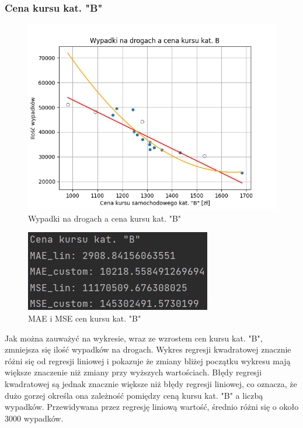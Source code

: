 \documentclass[10pt]{article}
\begin{document}
\subsubsection{Cena kursu kat. "B"}
\begin{figure}[h]
\begin{center}
\includegraphics[width=0.5\linewidth]{images/plots/kurs.png}
\caption{Wypadki na drogach a cena kursu kat. "B"}
\end{center}
\end{figure}
\begin{figure}[h]
\begin{center}
\includegraphics[width=0.5\linewidth]{images/errors/kurs_errors.png}
\caption{MAE i MSE cen kursu kat. "B"}
\end{center}
\end{figure}
Jak można zauważyć na wykresie, wraz ze wzrostem cen kursu kat. "B", zmniejsza się ilość wypadków na drogach. Wykres regresji kwadratowej znacznie różni się od regresji liniowej i pokazuje że zmiany bliżej początku wykresu mają większe znaczenie niż zmiany przy wyższych wartościach. Błędy regresji kwadratowej są jednak znacznie większe niż błędy regresji liniowej, co oznacza, że dużo gorzej określa ona zależność pomiędzy ceną kursu kat. "B" a liczbą wypadków. Przewidywana przez regresję liniową wartość, średnio różni się o około 3000 wypadków.
\pagebreak
\end{document}
